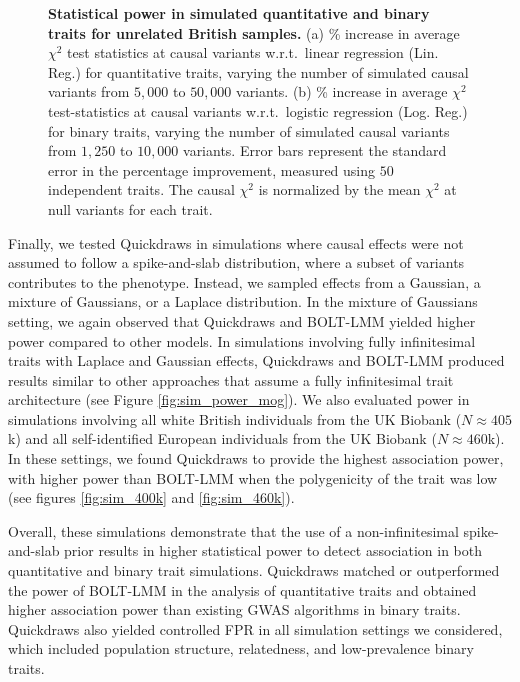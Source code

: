 \begin{figure}[h!]
    \caption{\textbf{Statistical power in simulated quantitative and binary traits for unrelated British samples.}
    (a) \% increase in average $\chi^2$ test statistics at causal variants w.r.t.\ linear regression (Lin. Reg.) for quantitative traits, varying the number of simulated causal variants from $5{,}000$ to $50{,}000$ variants.
    (b) \% increase in average $\chi^2$ test-statistics at causal variants w.r.t.\ logistic regression (Log. Reg.) for binary traits, varying the number of simulated causal variants from $1{,}250$ to $10{,}000$ variants.
    Error bars represent the standard error in the percentage improvement, measured using $50$ independent traits.
    The causal $\chi^2$ is normalized by the mean $\chi^2$ at null variants for each trait.
    } 
    \label{fig:sim_power}
\end{figure}

%
Finally, we tested Quickdraws in simulations where causal effects were not assumed to follow a spike-and-slab distribution, where a subset of variants contributes to the phenotype.
%
Instead, we sampled effects from a Gaussian, a mixture of Gaussians, or a Laplace distribution.
%
In the mixture of Gaussians setting, we again observed that Quickdraws and BOLT-LMM yielded higher power compared to other models.
%
In simulations involving fully infinitesimal traits with Laplace and Gaussian effects, Quickdraws and BOLT-LMM produced results similar to other approaches that assume a fully infinitesimal trait architecture (see Figure \ref{fig:sim_power_mog}).
%
We also evaluated power in simulations involving all white British individuals from the UK Biobank ($N \approx 405$k) and all self-identified European individuals from the UK Biobank ($N \approx 460$k).
%
In these settings, we found Quickdraws to provide the highest association power, with higher power than BOLT-LMM when the polygenicity of the trait was low (see figures \ref{fig:sim_400k} and \ref{fig:sim_460k}).
%
%



Overall, these simulations demonstrate that the use of a non-infinitesimal spike-and-slab prior results in higher statistical power to detect association in both quantitative and binary trait simulations.
%
Quickdraws matched or outperformed the power of BOLT-LMM in the analysis of quantitative traits and obtained higher association power than existing GWAS algorithms in binary traits.
%
Quickdraws also yielded controlled FPR in all simulation settings we considered, which included population structure, relatedness, and low-prevalence binary traits.

